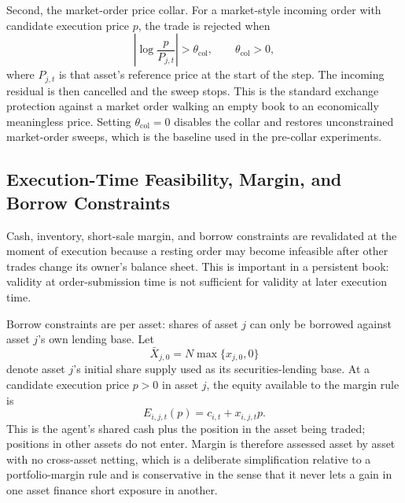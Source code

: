 \documentclass[12pt, a4paper]{article}
\begin{document}
    Second, the market-order price collar. For a market-style incoming order with
    candidate execution price \(p\), the trade is rejected when
    \[
        \left|\log\frac{p}{P_{j,t}}\right|>\theta_{\mathrm{col}},
        \qquad \theta_{\mathrm{col}}>0,
    \]
    where \(P_{j,t}\) is that asset's reference price at the start of the step. The
    incoming residual is then cancelled and the sweep stops. This is the standard
    exchange protection against a market order walking an empty book to an
    economically meaningless price. Setting \(\theta_{\mathrm{col}}=0\) disables
    the collar and restores unconstrained market-order sweeps, which is the
    baseline used in the pre-collar experiments.

    \subsection{Execution-Time Feasibility, Margin, and Borrow Constraints}\label{sec:short_sale_constraints}

    Cash, inventory, short-sale margin, and borrow constraints are revalidated at
    the moment of execution because a resting order may become infeasible after
    other trades change its owner's balance sheet. This is important in a
    persistent book: validity at order-submission time is not sufficient for
    validity at later execution time.

    Borrow constraints are per asset: shares of asset \(j\) can only be borrowed
    against asset \(j\)'s own lending base. Let
    \[
        \bar X_{j,0}=N\max\{x_{j,0},0\}
    \]
    denote asset \(j\)'s initial share supply used as its securities-lending base.
    At a candidate execution price \(p>0\) in asset \(j\), the equity available to
    the margin rule is
    \[
        E_{i,j,t}(p)=c_{i,t}+x_{i,j,t}p.
    \]
    This is the agent's shared cash plus the position in the asset being traded;
    positions in other assets do not enter. Margin is therefore assessed asset by
    asset with no cross-asset netting, which is a deliberate simplification
    relative to a portfolio-margin rule and is conservative in the sense that it
    never lets a gain in one asset finance short exposure in another.
\end{document}
